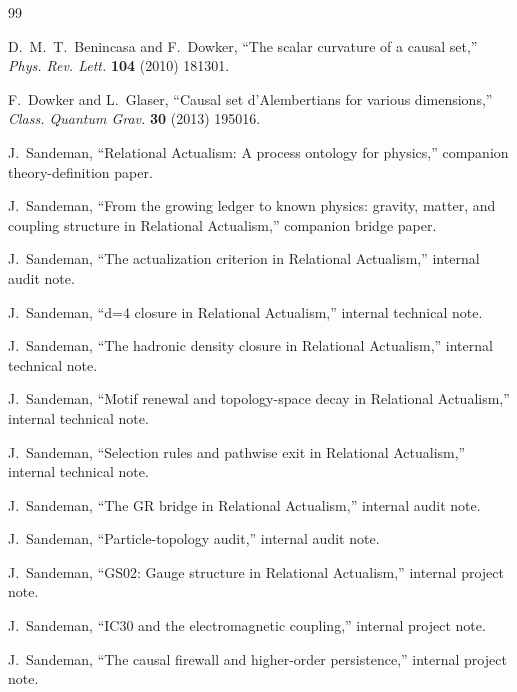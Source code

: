 \documentclass[11pt]{article}
\begin{document}
\begin{thebibliography}{99}

D.~M.~T.~Benincasa and F.~Dowker,
``The scalar curvature of a causal set,''
\emph{Phys. Rev. Lett.} \textbf{104} (2010) 181301.

F.~Dowker and L.~Glaser,
``Causal set d'Alembertians for various dimensions,''
\emph{Class. Quantum Grav.} \textbf{30} (2013) 195016.

J.~Sandeman,
``Relational Actualism: A process ontology for physics,''
companion theory-definition paper.

J.~Sandeman,
``From the growing ledger to known physics: gravity, matter, and coupling structure in Relational Actualism,''
companion bridge paper.

J.~Sandeman,
``The actualization criterion in Relational Actualism,''
internal audit note.

J.~Sandeman,
``d=4 closure in Relational Actualism,''
internal technical note.

J.~Sandeman,
``The hadronic density closure in Relational Actualism,''
internal technical note.

J.~Sandeman,
``Motif renewal and topology-space decay in Relational Actualism,''
internal technical note.

J.~Sandeman,
``Selection rules and pathwise exit in Relational Actualism,''
internal technical note.

J.~Sandeman,
``The GR bridge in Relational Actualism,''
internal audit note.

J.~Sandeman,
``Particle-topology audit,''
internal audit note.

J.~Sandeman,
``GS02: Gauge structure in Relational Actualism,''
internal project note.

J.~Sandeman,
``IC30 and the electromagnetic coupling,''
internal project note.

J.~Sandeman,
``The causal firewall and higher-order persistence,''
internal project note.

\end{thebibliography}
\end{document}
